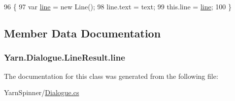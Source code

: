 \begin{DoxyCode}
96                                             \{
97                 var \hyperlink{a00064_abfbb0ea840b02acd0ecdc72c5b120257}{line} = \textcolor{keyword}{new} Line();
98                 line.text = text;
99                 this.line = \hyperlink{a00064_abfbb0ea840b02acd0ecdc72c5b120257}{line};
100             \}
\end{DoxyCode}


\subsection{Member Data Documentation}
\hypertarget{a00064_abfbb0ea840b02acd0ecdc72c5b120257}{
\subsubsection[{line}]{ Yarn.\-Dialogue.\-Line\-Result.\-line}}\label{a00064_abfbb0ea840b02acd0ecdc72c5b120257}


The documentation for this class was generated from the following file\-:\begin{DoxyCompactItemize}
\item 
Yarn\-Spinner/\hyperlink{a00138}{Dialogue.\-cs}\end{DoxyCompactItemize}
